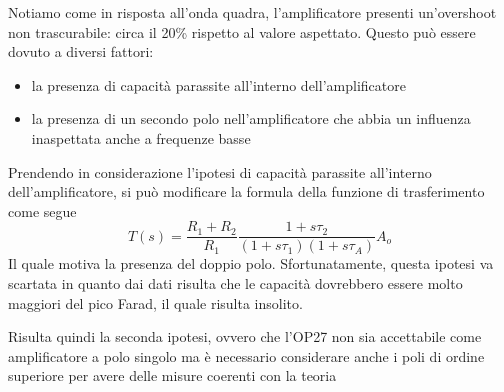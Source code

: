 




\begin{flushleft}

\colorbox{notebox}{
\begin{minipage}[]{\textwidth}

    Notiamo come in risposta all'onda quadra, l'amplificatore presenti un'overshoot non trascurabile: circa il 20\% rispetto al valore aspettato.
Questo può essere dovuto a diversi fattori:
\begin{itemize}
    \item la presenza di capacità parassite all'interno dell'amplificatore
    \item la presenza di un secondo polo nell'amplificatore che abbia un influenza inaspettata anche a frequenze basse
\end{itemize}
Prendendo in considerazione l'ipotesi di capacità parassite all'interno dell'amplificatore, si può modificare la formula della funzione di trasferimento come segue
\begin{equation}
    T(s) = \frac{R_1+R_2}{R_1} \frac{1+s\tau_2}{(1+s\tau_1)(1+s\tau_A)} A_o
\end{equation}
Il quale motiva la presenza del doppio polo. Sfortunatamente, questa ipotesi va scartata in quanto dai dati risulta che le capacità dovrebbero essere molto maggiori del pico Farad, il quale risulta insolito.

Risulta quindi la seconda ipotesi, ovvero che l'OP27 non sia accettabile come amplificatore a polo singolo ma è necessario considerare anche i poli di ordine superiore per avere delle misure coerenti con la teoria
\end{minipage}
}
\end{flushleft}



